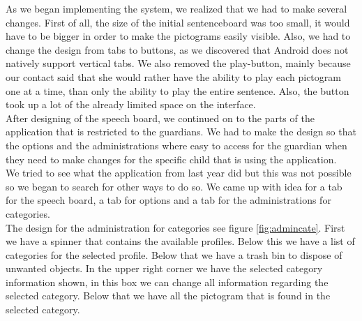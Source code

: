 As we began implementing the system, we realized that we had to make several changes. First of all, the size of the initial sentenceboard was too small, it would have to be bigger in order to make the pictograms easily visible. Also, we had to change the design from tabs to buttons, as we discovered that Android does not natively support vertical tabs. We also removed the play-button, mainly because our contact said that she would rather have the ability to play each pictogram one at a time, than only the ability to play the entire sentence. Also, the button took up a lot of the already limited space on the interface.\newline
\\
After designing of the speech board, we continued on to the parts of the application that is restricted to the guardians. We had to make the design so that the options and the administrations where easy to access for the guardian when they need to make changes for the specific child that is using the application. 
\\
We tried to see what the application from last year did but this was not possible so we began to search for other ways to do so. We came up with idea for a tab for the speech board, a tab for options and a tab for the administrations for categories.\\

The design for the administration for categories see figure \ref{fig:admincate}. First we have a spinner that contains the available profiles. Below this we have a list of  categories for the selected profile. Below that we have a trash bin to dispose of unwanted objects. In the upper right corner we have the selected category information shown, in this box we can change all information regarding the selected category. Below that we have all the pictogram that is found in the selected category.       

